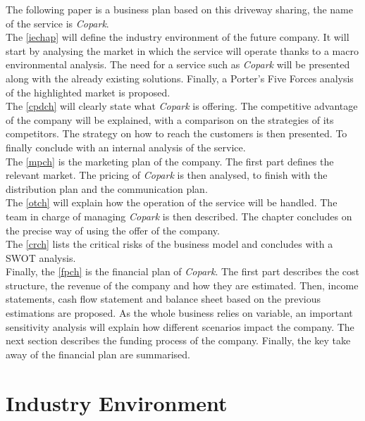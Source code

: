 \documentclass[12pt,a4paper,oneside]{book}
\newcommand{\bp}{\textit{Copark}}
\begin{document}
The following paper is a business plan based on this driveway sharing, the name of the service is \bp{}.\\

The \autoref{iechap} will define the industry environment of the future company. It will start by analysing the market in which the service will operate thanks to a macro environmental analysis. The need for a service such as \bp{} will be presented along with the already existing solutions. Finally, a Porter's Five Forces analysis of the highlighted market is proposed.\\

The \autoref{cpdch} will clearly state what \bp{} is offering. The competitive advantage of the company will be explained, with a comparison on the strategies of its competitors. The strategy on how to reach the customers is then presented. To finally conclude with an internal analysis of the service.\\

The \autoref{mpch} is the marketing plan of the company. The first part defines the relevant market. The pricing of \bp{} is then analysed, to finish with the distribution plan and the communication plan.\\

The \autoref{otch} will explain how the operation of the service will be handled. The team in charge of managing \bp{} is then described. The chapter concludes on the precise way of using the offer of the company.\\

The \autoref{crch} lists the critical risks of the business model and concludes with a SWOT analysis.\\

Finally, the \autoref{fpch} is the financial plan of \bp{}. The first part describes the cost structure, the revenue of the company and how they are estimated. Then, income statements, cash flow statement and balance sheet based on the previous estimations are proposed. As the whole business relies on variable, an important sensitivity analysis will explain how different scenarios impact the company. The next section describes the funding process of the company. Finally, the key take away of the financial plan are summarised.

\chapter{Industry Environment}
\label{iechap}
\end{document}
